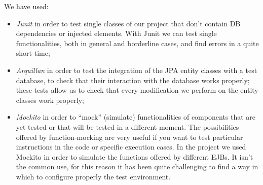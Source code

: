 We have used:
\begin{itemize}
\item \textit{Junit} in order to test single classes of our project that don't contain DB dependencies or injected elements. With Junit we can test single functionalities, both in general and borderline cases, and find errors in a quite short time;
\item \textit{Arquillan} in order to test the integration of the JPA entity classes with a test database, to check that their interaction with the database works properly; these tests allow us to check that every modification we perform on the entity classes work properly; 
\item \textit{Mockito} in order to “mock” (simulate) functionalities of components that are yet tested or that will be tested in a different moment. The possibilities offered by function-mocking are very useful if you want to test particular instructions in the code or specific execution cases. In the project we used Mockito in order to simulate the functions offered by different EJBs. It isn't the common use, for this reason it has been quite challenging to find a way in which to configure properly the test environment. 
\end{itemize}